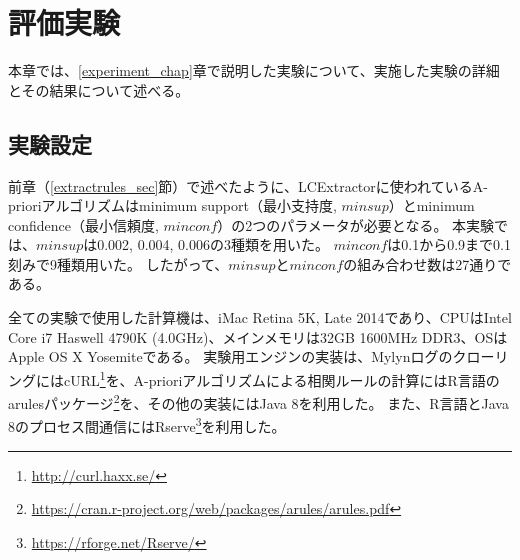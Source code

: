 \documentclass[a4paper]{jsbook}
\newcommand{\minconf}{mincon\!f}
\begin{document}
\chapter{評価実験}\label{result_chap}
本章では、\ref{experiment_chap}章で説明した実験について、実施した実験の詳細とその結果について述べる。

\section{実験設定}\label{setting_sec}
前章（\ref{extractrules_sec}節）で述べたように、LCExtractorに使われているA-prioriアルゴリズムはminimum support（最小支持度, $minsup$）とminimum confidence（最小信頼度, $\minconf$）の2つのパラメータが必要となる。
本実験では、$minsup$は0.002, 0.004, 0.006の3種類を用いた。
$\minconf$は0.1から0.9まで0.1刻みで9種類用いた。
したがって、$minsup$と$\minconf$の組み合わせ数は27通りである。

全ての実験で使用した計算機は、iMac Retina 5K, Late 2014であり、CPUはIntel Core i7 Haswell 4790K (4.0GHz)、メインメモリは32GB 1600MHz DDR3、OSはApple OS X Yosemiteである。
実験用エンジンの実装は、MylynログのクローリングにはcURL\footnote{\url{http://curl.haxx.se/}}を、A-prioriアルゴリズムによる相関ルールの計算にはR言語のarulesパッケージ\footnote{\url{https://cran.r-project.org/web/packages/arules/arules.pdf}}を、その他の実装にはJava 8を利用した。
また、R言語とJava 8のプロセス間通信にはRserve\footnote{\url{https://rforge.net/Rserve/}}を利用した。
\end{document}
